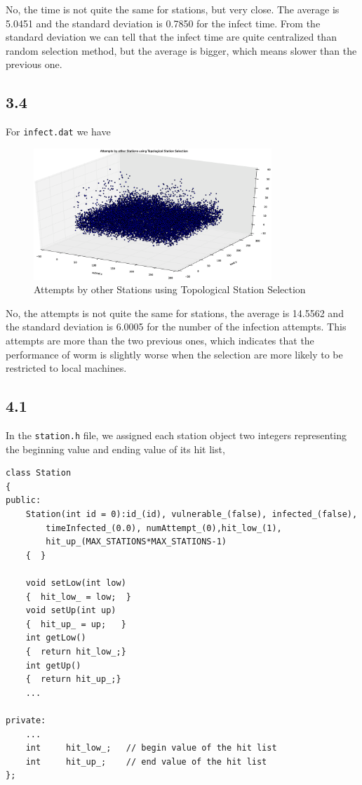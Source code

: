 \documentclass[10pt]{article}
\begin{document}
No, the time is not quite the same for stations, but very close. The average is 5.0451 and the standard deviation is 0.7850 for the infect time. From the standard deviation we can tell that the infect time are quite centralized than random selection method, but the average is bigger, which means slower than the previous one.

\subsection*{3.4}
For \texttt{infect.dat} we have

\begin{figure}[H]
\begin{center}
\includegraphics[width=0.8\textwidth]{figure3.4.eps}
\caption{Attempts by other Stations using Topological Station Selection}
\end{center}
\end{figure}

No, the attempts is not quite the same for stations, the average is 14.5562 and the standard deviation is 6.0005 for the number of the infection attempts. This attempts are more than the two previous ones, which indicates that the performance of worm is slightly worse when the selection are more likely to be restricted to local machines.


\subsection*{4.1}

In the \texttt{station.h} file, we assigned each station object two integers representing the beginning value and ending value of its hit list,

\begin{lstlisting}
class Station
{
public:
	Station(int id = 0):id_(id), vulnerable_(false), infected_(false),
		timeInfected_(0.0), numAttempt_(0),hit_low_(1),
        hit_up_(MAX_STATIONS*MAX_STATIONS-1)
	{  }
	
	void setLow(int low)
	{  hit_low_ = low;  }
	void setUp(int up)
	{  hit_up_ = up;   }
	int getLow()
	{  return hit_low_;}
	int getUp()
	{  return hit_up_;}
    ...

private:
    ...
	int 	hit_low_;	// begin value of the hit list
	int 	hit_up_;	// end value of the hit list
};
\end{lstlisting}
\end{document}
